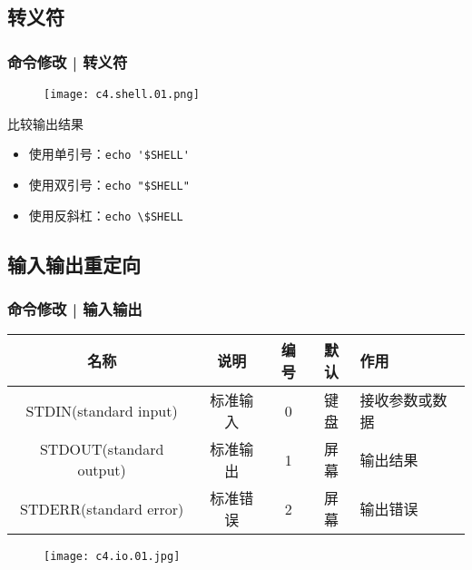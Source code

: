 \subsection{转义符}
\begin{frame}[fragile]
  \frametitle{命令修改 | \alert{转义符}}
  \begin{figure}
    \centering
    \texttt{[image: c4.shell.01.png]}
  \end{figure}
  \pause
  \begin{block}{比较输出结果}
    \begin{itemize}
      \item 使用单引号：\verb|echo '$SHELL'|
      \item 使用双引号：\verb|echo "$SHELL"|
      \item 使用反斜杠：\verb|echo \$SHELL|
    \end{itemize}
  \end{block}
\end{frame}

\subsection{输入输出重定向}
\begin{frame}
  \frametitle{命令修改 | \alert{输入输出}}
  \begin{table}
    \centering
    \begin{tabular}{ccccl}
      \hline
      \rowcolor{blue!50}名称 & 说明 & 编号 & 默认 & 作用\\
      \hline
      STDIN(standard input) & 标准输入 & 0 & 键盘 & 接收参数或数据\\
      STDOUT(standard output) & 标准输出 & 1 & 屏幕 & 输出结果\\
      STDERR(standard error) & 标准错误 & 2 & 屏幕 & 输出错误\\
      \hline
    \end{tabular}
  \end{table}
  \begin{figure}
    \centering
    \texttt{[image: c4.io.01.jpg]}
  \end{figure}
\end{frame}

